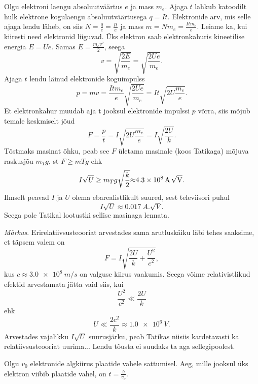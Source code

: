 \documentclass[10pt]{article}
\begin{document}
{
\solu
Olgu elektroni laengu absoluutväärtus $e$ ja mass $m_e$. Ajaga $t$ lahkub katoodilt hulk elektrone kogulaengu absoluutväärtusega $q = It$. Elektronide arv, mis selle ajaga lendu läheb, on siis $N = \frac{q}{e} = \frac{It}{e}$ ja mass $m = Nm_e = \frac{Itm_e}{e}$. Leiame ka, kui kiiresti need elektronid liiguvad. Üks elektron saab elektronkahuris kineetilise energia $E = Ue$. Samas $E = \frac{m_ev^2}{2}$, seega
\[
v=\sqrt{\frac{2 E}{m_{e}}}=\sqrt{\frac{2 U e}{m_{e}}}. 
\]
Ajaga $t$ lendu läinud elektronide koguimpulss
\[
p=m v=\frac{I t m_{e}}{e} \sqrt{\frac{2 U e}{m_{e}}}=I t \sqrt{2 U \frac{m_{e}}{e}}.
\]
Et elektronkahur muudab aja t jooksul elektronide impulssi $p$ võrra, siis mõjub temale keskmiselt jõud
\[
F=\frac{p}{t}=I \sqrt{2 U \frac{m_{e}}{e}}=I \sqrt{\frac{2 U}{k}}.
\] 
Tõstmaks masinat õhku, peab see $F$ ületama masinale (koos Tatikaga) mõjuva raskusjõu $m_T g$, st $F \geq mT g$ ehk
\[
I \sqrt{U} \geq m_{T} g \sqrt{\frac{k}{2}} \SI{\approx 4,3e8}{A.\sqrt{V}}. 
\]
Ilmselt peavad $I$ ja $U$ olema ebarealistlikult suured, sest televiisori puhul 
\[
I \sqrt U \approx \SI{0,017}{A.\sqrt{V}}.
\]
Seega pole Tatikal lootustki sellise masinaga lennata.

\emph{Märkus}. Erirelatiivsusteooriat arvestades sama arutluskäiku läbi tehes saaksime, et täpsem valem on 
\[
F=I \sqrt{\frac{2 U}{k}+\frac{U^{2}}{c^{2}}},
\]
kus $c \approx \SI{3,0e8}{m/s}$ on valguse kiirus vaakumis. Seega võime relativistlikud efektid arvestamata jätta vaid siis, kui 
\[
\frac{U^2}{c^2} \ll \frac{2U}{k}
\]
ehk 
\[
U \ll \frac{2 c^{2}}{k} \approx \SI{1,0e6}{V}.
\] 
Arvestades vajalikku $I \sqrt U$ suurusjärku, peab Tatikas niisiis kardetavasti ka relatiivsusteooriat uurima... Lendu tõusta ei suudaks ta aga sellegipoolest.
\probend
\bigskip


\solu
Olgu $v_0$ elektronide algkiirus plaatide vahele sattumisel. Aeg, mille jooksul üks elektron viibib plaatide vahel, on $t = \frac{b}{v_o}$.

}
\end{document}
